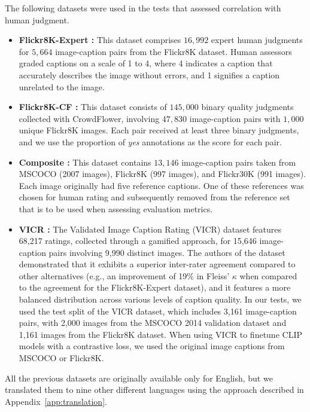 The following datasets were used in the tests that assessed correlation with human judgment.
\begin{itemize}\setlength\itemsep{0em}
\item \textbf{Flickr8K-Expert \cite{hodosh2013framing}:}
This dataset comprises $16,992$ expert human judgments for $5,664$ image-caption pairs from the Flickr8K dataset. Human assessors graded captions on a scale of 1 to 4, where 4 indicates a caption that accurately describes the image without errors, and 1 signifies a caption unrelated to the image.

\item \textbf{Flickr8K-CF \cite{hodosh2013framing}:} This dataset consists of $145,000$ binary quality judgments collected with CrowdFlower, involving  $47,830$ image-caption pairs with $1,000$ unique Flickr8K images. Each pair received at least three binary judgments, and we use the proportion of {\it yes} annotations as the score for each pair.

\item \textbf{Composite \cite{aditya2015images}:} This dataset contains $13,146$ image-caption pairs taken from MSCOCO (2007 images), Flickr8K (997 images), and Flickr30K (991 images). Each image originally had five reference captions. One of these references was chosen for human rating and subsequently removed from the reference set that is to be used when assessing evaluation metrics.

\item \textbf{VICR \cite{narins2024validated}:} The Validated Image Caption Rating (VICR) dataset features 68,217 ratings, collected through a gamified approach, for 15,646 image-caption pairs involving 9,990 distinct images. The authors of the dataset demonstrated that it exhibits a superior inter-rater agreement compared to other alternatives (e.g., an improvement of 19\% in Fleiss’ $\kappa$ when compared to the agreement for the Flickr8K-Expert dataset), and it features a more balanced distribution across various levels of caption quality. In our tests, we used the test split of the VICR dataset, which includes 3,161 image-caption pairs, with 2,000 images from the MSCOCO 2014 validation dataset and 1,161 images from the Flickr8K dataset. When using VICR to finetune CLIP models with a contrastive loss, we used the original image captions from MSCOCO or Flickr8K.
\end{itemize}

All the previous datasets are originally available only for English, but we translated them to nine other different languages using the approach described in Appendix~\ref{app:translation}.

